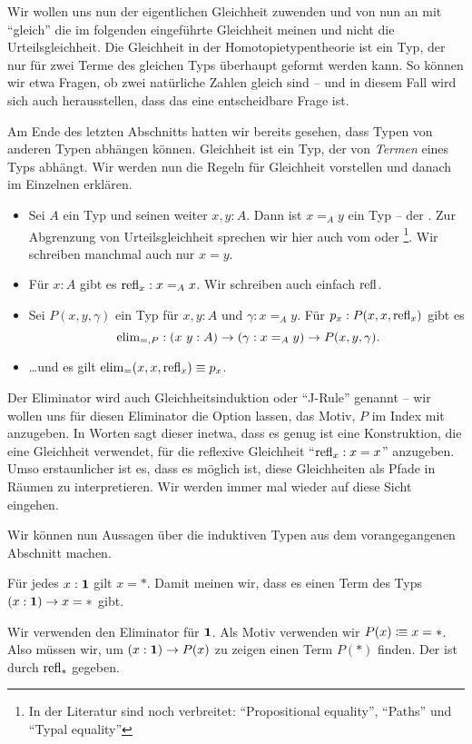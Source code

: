 Wir wollen uns nun der eigentlichen Gleichheit zuwenden und von nun an mit ``gleich'' die im folgenden eingeführte Gleichheit meinen und nicht die Urteilsgleichheit.
Die Gleichheit in der Homotopietypentheorie ist ein Typ, der nur für zwei Terme des gleichen Typs überhaupt geformt werden kann.
So können wir etwa Fragen, ob zwei natürliche Zahlen gleich sind -- und in diesem Fall wird sich auch herausstellen, dass das eine entscheidbare Frage ist.

Am Ende des letzten Abschnitts hatten wir bereits gesehen, dass Typen von anderen Typen abhängen können. Gleichheit ist ein Typ, der von \emph{Termen} eines Typs abhängt.
Wir werden nun die Regeln für Gleichheit vorstellen und danach im Einzelnen erklären.

\begin{regeln}
\begin{itemize}
\item Sei $A$ ein Typ und seinen weiter $x,y:A$. Dann ist $x=_Ay$ ein Typ -- der . Zur Abgrenzung von Urteilsgleichheit sprechen wir hier auch vom  oder \footnote{In der Literatur sind noch verbreitet: ``Propositional equality'', ``Paths'' und ``Typal equality''}. Wir schreiben manchmal auch nur $x=y$.
\item Für $x:A$ gibt es $\mathrm{refl}_x:x=_Ax$. Wir schreiben auch einfach $\mathrm{refl}$.
\item Sei $P(x,y,\gamma)$ ein Typ für $x,y:A$ und $\gamma:x=_Ay$.
  Für $p_{x}:P(x,x,\mathrm{refl}_x)$ gibt es
  \[
    \elim_{=,P}:(x\ y : A) \to (\gamma : x=_Ay) \to P(x,y,\gamma)\rlap{.}
  \]
\item \dots und es gilt $\mathrm{elim}_=(x,x,\mathrm{refl}_x)\equiv p_x$.
\end{itemize}
\end{regeln}

Der Eliminator wird auch Gleichheitsinduktion oder ``J-Rule'' genannt -- wir wollen uns für diesen Eliminator die Option lassen, das Motiv, $P$ im Index mit anzugeben.
In Worten sagt dieser inetwa, dass es genug ist eine Konstruktion, die eine Gleichheit verwendet, für die reflexive Gleichheit ``$\mathrm{refl}_x:x=x$'' anzugeben.
Umso erstaunlicher ist es, dass es möglich ist, diese Gleichheiten als Pfade in Räumen zu interpretieren. Wir werden immer mal wieder auf diese Sicht eingehen.

Wir können nun Aussagen über die induktiven Typen aus dem vorangegangenen Abschnitt machen.
\begin{bemerkung}
  Für jedes $x:\mathbf{1}$ gilt $x=\ast$.
  Damit meinen wir, dass es einen Term des Typs $(x:\mathbf{1})\to x=\ast$ gibt.
\end{bemerkung}
\begin{beweis}
  Wir verwenden den Eliminator für $\mathbf{1}$.
  Als Motiv verwenden wir $P(x)\vcentcolon\mspace{-1.2mu}\equiv x=\ast$. Also müssen wir, um $(x:\mathbf{1})\to P(x)$ zu zeigen einen Term $P(\ast)$ finden. Der ist durch $\mathrm{refl}_\ast$ gegeben. 
\end{beweis}

